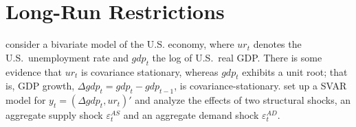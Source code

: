 \section[Long-Run Restrictions]{Long-Run Restrictions\label{ex:BlanchardQuahLongRunRestrictions}}
\textcite{Blanchard.Quah_1989_DynamicEffectsAggregate} consider a bivariate model of the U.S. economy,
  where \(ur_t\) denotes the U.S.\ unemployment rate and \(gdp_t\) the log of U.S.\ real GDP\@.
There is some evidence that \(ur_t\) is covariance stationary,
  whereas \(gdp_t\) exhibits a unit root;
  that is, GDP growth, \(\Delta gdp_t = gdp_{t} - gdp_{t-1}\), is covariance-stationary.
\textcite{Blanchard.Quah_1989_DynamicEffectsAggregate} set up a SVAR model for \(y_t = (\Delta gdp_t, ur_t)'\)
  and analyze the effects of two structural shocks,
  an aggregate supply shock \(\varepsilon_t^{AS}\)
  and an aggregate demand shock \(\varepsilon_t^{AD}\).

